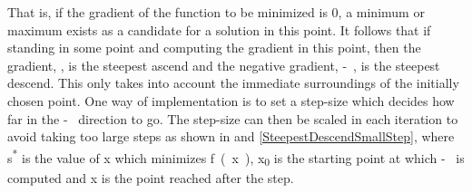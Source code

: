 That is, if the gradient of the function to be minimized is 0, a minimum or maximum exists as a candidate for a solution in this point. It follows that if standing in some point and computing the gradient in this point, then the gradient, \si{}, is the steepest ascend and the negative gradient, \si{-}, is the steepest descend. This only takes into account the immediate surroundings of the initially chosen point. One way of implementation is to set a step-size which decides how far in the \si{-} direction to go. The step-size can then be scaled in each iteration to avoid taking too large steps as shown in  and \ref{SteepestDescendSmallStep}, where \si{s^*} is the value of \si{x} which minimizes \si{f(x)}, \si{x_0} is the starting point at which \si{-} is computed and \si{x} is the point reached after the step.
%
